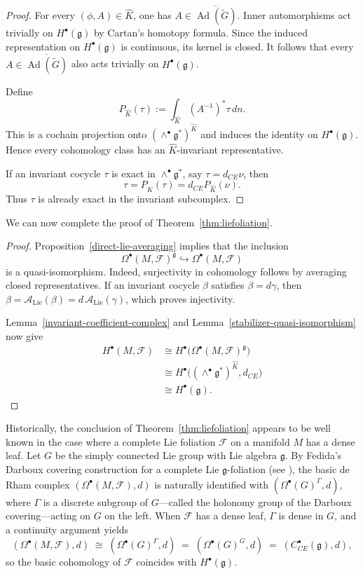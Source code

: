 \documentclass[reqno, 11pt]{amsart}
\theoremstyle{definition}
\theoremstyle{property}
\theoremstyle{remark}
\numberwithin{equation}{section}
\begin{document}
\begin{proof}
For every $(\phi,A)\in\widehat K$, one has
$A\in\overline{\operatorname{Ad}(\widetilde G)}$. Inner automorphisms act
trivially on $H^\bullet(\mathfrak g)$ by Cartan's homotopy formula. Since the
induced representation on $H^\bullet(\mathfrak g)$ is continuous, its kernel
is closed. It follows that every
$A\in\overline{\operatorname{Ad}(\widetilde G)}$ also acts trivially on
$H^\bullet(\mathfrak g)$.

Define
\[
P_{\widehat K}(\tau)
:=
\int_{\widehat K}(A^{-1})^*\tau\,dn.
\]
This is a cochain projection onto
$(\wedge^\bullet\mathfrak g^*)^{\widehat K}$ and induces the identity on
$H^\bullet(\mathfrak g)$. Hence every cohomology class has an
$\widehat K$-invariant representative.

If an invariant cocycle $\tau$ is exact in
$\wedge^\bullet\mathfrak g^*$, say $\tau=d_{CE}\nu$, then
\[
\tau
=
P_{\widehat K}(\tau)
=
d_{CE}P_{\widehat K}(\nu).
\]
Thus $\tau$ is already exact in the invariant subcomplex.
\end{proof}

We can now complete the proof of Theorem~\ref{thm:liefoliation}.

\begin{proof}
Proposition~\ref{direct-lie-averaging} implies that the inclusion
\[
\Omega^\bullet(M,\mathcal F)^{\mathfrak g}
\hookrightarrow
\Omega^\bullet(M,\mathcal F)
\]
is a quasi-isomorphism. Indeed, surjectivity in cohomology follows by
averaging closed representatives. If an invariant cocycle $\beta$ satisfies
$\beta=d\gamma$, then
$
\beta
=
\mathcal A_{\mathrm{Lie}}(\beta)
=
d\,\mathcal A_{\mathrm{Lie}}(\gamma)$, 
which proves injectivity.

Lemma~\ref{invariant-coefficient-complex} and
Lemma~\ref{stabilizer-quasi-isomorphism} now give
\[
\begin{aligned}
H^\bullet(M,\mathcal F)
&\cong
H^\bullet\bigl(
\Omega^\bullet(M,\mathcal F)^{\mathfrak g}
\bigr)\\
&\cong
H^\bullet\bigl(
(\wedge^\bullet\mathfrak g^*)^{\widehat K},
d_{CE}
\bigr)\\
&\cong
H^\bullet(\mathfrak g).
\end{aligned}
\]
\end{proof}


Historically, the conclusion of Theorem~\ref{thm:liefoliation} appears to be
well known in the case where a complete Lie foliation $\mathcal F$ on a manifold $M$ has a dense leaf. Let $G$ be the
simply connected Lie group with Lie algebra $\mathfrak g$. By
Fedida's Darboux covering construction for a complete Lie $\mathfrak g$-foliation
(see \cite[Chapter~4.2]{Mo88}), the basic de Rham complex
$(\Omega^\bullet(M,\mathcal F),d)$ is naturally identified with $(\Omega^\bullet(G)^\Gamma,d)$,
where $\Gamma$ is a discrete subgroup of $G$---called the holonomy group of the
Darboux covering---acting on $G$ on the left. When $\mathcal F$ has a dense
leaf, $\Gamma$ is dense in $G$, and a continuity argument yields
\[
(\Omega^\bullet(M,\mathcal F),d)
\;\cong\;(\Omega^\bullet(G)^\Gamma,d)
\;=\;(\Omega^\bullet(G)^G,d)
\;=\;(C_{CE}^\bullet(\mathfrak g),d),
\]
so the basic cohomology of $\mathcal F$ coincides with $H^\bullet(\mathfrak g)$.
\end{document}
